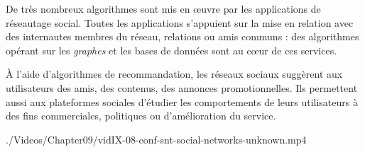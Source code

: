 \begin{tcolorbox}[title={Algorithmes et programmes}, toprule=0pt, leftrule=0pt, rightrule=0pt, arc=0pt,
                  fonttitle=\scshape\boxtitlefont,
                  colbacktitle=white, coltitle=firstcolor, colframe=firstcolor, colback=firstcolor!10,
                  breakable, enhanced jigsaw]
De très nombreux algorithmes sont mis en œuvre par les applications de réseautage social.
Toutes les applications s’appuient sur la mise en relation avec des internautes membres du réseau, relations ou amis communs : des algorithmes opérant sur les \emph{graphes} et les bases de données sont au cœur de ces services.

À l’aide d’algorithmes de recommandation, les réseaux sociaux suggèrent aux utilisateurs des amis, des contenus, des annonces promotionnelles. Ils permettent aussi aux plateformes sociales d’étudier les comportements de leurs utilisateurs à des fins commerciales, politiques ou d’amélioration du service.
\end{tcolorbox}



\begin{marginvideo}
		{./Videos/Chapter09/vidIX-08-conf-snt-social-networks-unknown.mp4}%
\end{marginvideo}

